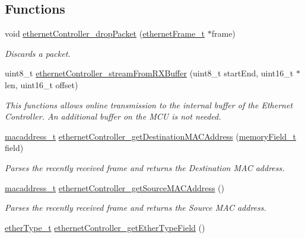 \subsection*{Functions}
\begin{DoxyCompactItemize}
\item 
void \mbox{\hyperlink{group__data__reception_gada8fcdc667d1800b5f963bfc8cea56c2}{ethernet\+Controller\+\_\+drop\+Packet}} (\mbox{\hyperlink{group__ethernet_ga7519a7ae14b490659069435698d28a25}{ethernet\+Frame\+\_\+t}} $\ast$frame)
\begin{DoxyCompactList}\small\item\em Discards a packet. \end{DoxyCompactList}\item 
uint8\+\_\+t \mbox{\hyperlink{group__data__reception_ga5748b4be9f5e6936ab91753411a440d9}{ethernet\+Controller\+\_\+stream\+From\+R\+X\+Buffer}} (uint8\+\_\+t start\+End, uint16\+\_\+t $\ast$len, uint16\+\_\+t offset)
\begin{DoxyCompactList}\small\item\em This functions allows online transmission to the internal buffer of the Ethernet Controller. An additional buffer on the M\+CU is not needed. \end{DoxyCompactList}\item 
\mbox{\hyperlink{group__ethernet_gacb865bcbf50a6c8cef05581bfabff373}{macaddress\+\_\+t}} \mbox{\hyperlink{group__data__reception_ga29e5c29891e62206ceed99a6b15749a0}{ethernet\+Controller\+\_\+get\+Destination\+M\+A\+C\+Address}} (\mbox{\hyperlink{group__memory_ga1d04d80fae40964f55d2df46b5d64785}{memory\+Field\+\_\+t}} field)
\begin{DoxyCompactList}\small\item\em Parses the recently received frame and returns the Destination M\+AC address. \end{DoxyCompactList}\item 
\mbox{\hyperlink{group__ethernet_gacb865bcbf50a6c8cef05581bfabff373}{macaddress\+\_\+t}} \mbox{\hyperlink{group__data__reception_gaa299c646a9c07c0ee81e8c673acd56b2}{ethernet\+Controller\+\_\+get\+Source\+M\+A\+C\+Address}} ()
\begin{DoxyCompactList}\small\item\em Parses the recently received frame and returns the Source M\+AC address. \end{DoxyCompactList}\item 
\mbox{\hyperlink{group__ethernet_ga467703afefdcaf7893a7da3eb63280ed}{ether\+Type\+\_\+t}} \mbox{\hyperlink{group__data__reception_gae806930e1cc431f556f805fe1aef6355}{ethernet\+Controller\+\_\+get\+Ether\+Type\+Field}} ()

\end{DoxyCompactItemize}
